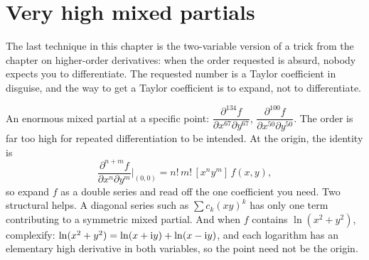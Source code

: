 \section{Very high mixed partials}

The last technique in this chapter is the two-variable version of a trick from the chapter on higher-order derivatives: when the order requested is absurd, nobody expects you to differentiate. The requested number is a Taylor coefficient in disguise, and the way to get a Taylor coefficient is to expand, not to differentiate.

\cue An enormous mixed partial at a specific point: $\dfrac{\partial^{134}f}{\partial x^{67}\partial y^{67}}$, $\dfrac{\partial^{100}f}{\partial x^{50}\partial y^{50}}$. The order is far too high for repeated differentiation to be intended.
\method At the origin, the identity is
\[
\frac{\partial^{n+m}f}{\partial x^{n}\partial y^{m}}\Big|_{(0,0)}=n!\,m!\,[x^{n}y^{m}]\,f(x,y),
\]
so expand $f$ as a double series and read off the one coefficient you need. Two structural helps. A diagonal series such as $\sum c_{k}(xy)^{k}$ has only one term contributing to a symmetric mixed partial. And when $f$ contains $\ln(x^{2}+y^{2})$, complexify: $\ln(x^{2}+y^{2})=\ln(x+\mathrm{i} y)+\ln(x-\mathrm{i} y)$, and each logarithm has an elementary high derivative in both variables, so the point need not be the origin.

